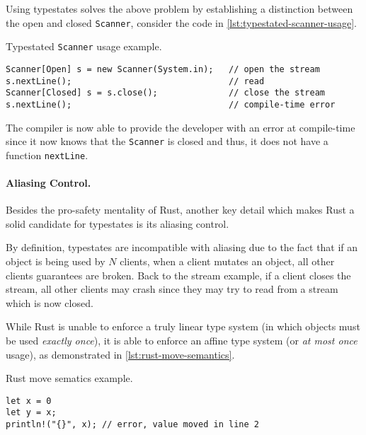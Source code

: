 \documentclass[a4paper, 10pt]{article}
\newenvironment{code}{\captionsetup{type=listing}}{}
\begin{document}
Using typestates solves the above problem by establishing a distinction between the open and closed \texttt{Scanner},
consider the code in \autoref{lst:typestated-scanner-usage}.

\begin{code}
    \caption{Typestated \texttt{Scanner} usage example.}
    \label{lst:typestated-scanner-usage}
    \begin{verbatim}
Scanner[Open] s = new Scanner(System.in);   // open the stream
s.nextLine();                               // read
Scanner[Closed] s = s.close();              // close the stream
s.nextLine();                               // compile-time error
    \end{verbatim}
\end{code}

The compiler is now able to provide the developer with an error at compile-time
since it now knows that the \texttt{Scanner} is closed and thus,
it does not have a function \texttt{nextLine}.

\paragraph{Aliasing Control.}
Besides the pro-safety mentality of Rust,
another key detail which makes Rust a solid candidate for typestates is its aliasing control.

By definition, typestates are incompatible with aliasing
due to the fact that if an object is being used by $N$ clients,
when a client mutates an object, all other clients guarantees are broken.
Back to the stream example, if a client closes the stream,
all other clients may crash since they may try to read from a stream which is now closed.

While Rust is unable to enforce a truly linear type system (in which objects must be used \emph{exactly once}),
it is able to enforce an affine type system (or \emph{at most once} usage), as demonstrated in \autoref{lst:rust-move-semantics}.


\begin{code}
    \caption{Rust move sematics example.}
    \label{lst:rust-move-semantics}
    \begin{verbatim}
let x = 0
let y = x;
println!("{}", x); // error, value moved in line 2
    \end{verbatim}
\end{code}
\end{document}
